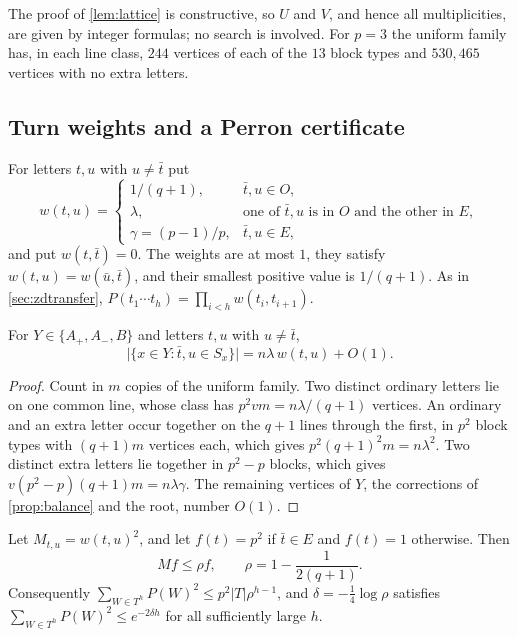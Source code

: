 \documentclass[11pt]{article}
\theoremstyle{definition}
\theoremstyle{plain}
\begin{document}
The proof of \cref{lem:lattice} is constructive, so $U$ and $V$, and hence all multiplicities, are given by integer formulas; no search is involved. For $p=3$ the uniform family has, in each line class, $244$ vertices of each of the $13$ block types and $530{,}465$ vertices with no extra letters.

\subsection{Turn weights and a Perron certificate}\label{sec:oddturn}

For letters $t,u$ with $u\neq\bar t$ put
\begin{equation}\label{eq:oddw}
w(t,u)=\begin{cases}1/(q+1),&\bar t,u\in O,\\ \lambda,&\text{one of }\bar t,u\text{ is in }O\text{ and the other in }E,\\ \gamma=(p-1)/p,&\bar t,u\in E,\end{cases}
\end{equation}
and put $w(t,\bar t)=0$. The weights are at most $1$, they satisfy $w(t,u)=w(\bar u,\bar t)$, and their smallest positive value is $1/(q+1)$. As in \cref{sec:zdtransfer}, $P(t_1\cdots t_h)=\prod_{i<h}w(t_i,t_{i+1})$.

\begin{lemma}\label{lem:oddturn}
For $Y\in\{A_+,A_-,B\}$ and letters $t,u$ with $u\neq\bar t$,
\[
\bigl|\{x\in Y:\bar t,u\in S_x\}\bigr|=n\lambda\,w(t,u)+O(1).
\]
\end{lemma}

\begin{proof}
Count in $m$ copies of the uniform family. Two distinct ordinary letters lie on one common line, whose class has $p^2vm=n\lambda/(q+1)$ vertices. An ordinary and an extra letter occur together on the $q+1$ lines through the first, in $p^2$ block types with $(q+1)m$ vertices each, which gives $p^2(q+1)^2m=n\lambda^2$. Two distinct extra letters lie together in $p^2-p$ blocks, which gives $v(p^2-p)(q+1)m=n\lambda\gamma$. The remaining vertices of $Y$, the corrections of \cref{prop:balance} and the root, number $O(1)$.
\end{proof}

\begin{lemma}\label{lem:perron}
Let $M_{t,u}=w(t,u)^2$, and let $f(t)=p^2$ if $\bar t\in E$ and $f(t)=1$ otherwise. Then
\begin{equation}\label{eq:perron}
Mf\le\rho f,\qquad \rho=1-\frac1{2(q+1)}.
\end{equation}
Consequently $\sum_{W\in T^h}P(W)^2\le p^2|T|\rho^{h-1}$, and $\delta=-\frac14\log\rho$ satisfies $\sum_{W\in T^h}P(W)^2\le e^{-2\delta h}$ for all sufficiently large $h$.
\end{lemma}
\end{document}
